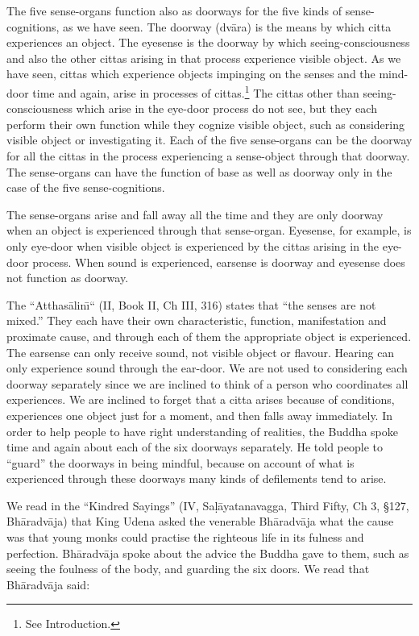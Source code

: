 \documentclass{book}
\begin{document}
The five sense-organs function also as doorways for the five kinds of
sense-cognitions, as we have seen. The doorway (dv{\=a}ra) is the
means by which citta experiences an object. The eyesense is the doorway
by which seeing-consciousness and also the other cittas arising in
that process experience visible object. As we have seen, cittas which
experience objects impinging on the senses and the mind-door time and
again, arise in processes of cittas.\footnote{See Introduction.} The cittas other than seeing-consciousness which
arise in the eye-door process do not see, but they each perform their
own function while they cognize visible object, such as considering
visible object or investigating it. Each of the five sense-organs can
be the doorway for all the cittas in the process experiencing a
sense-object through that doorway. The sense-organs can have the
function of base as well as doorway only in the case of the five
sense-cognitions. 

The sense-organs arise and fall away all the time and they are only
doorway when an object is experienced through that sense-organ.
Eyesense, for example, is only eye-door when visible object is
experienced by the cittas arising in the eye-door process. When sound
is experienced, earsense is doorway and eyesense does not function as
doorway.

The ``Atthas{\=a}lin\=\i`` (II, Book II, Ch III, 316) states that ``the
senses are not mixed.'' They each have their own characteristic,
function, manifestation and proximate cause, and through each of them
the appropriate object is experienced. The earsense can only receive
sound, not visible object or flavour. Hearing can only experience sound
through the ear-door. We are not used to considering each doorway
separately since we are inclined to think of a person who coordinates
all experiences. We are inclined to forget that a citta arises because
of conditions, experiences one object just for a moment, and then falls
away immediately. In order to help people to have right understanding
of realities, the Buddha spoke time and again about each of the six
doorways separately. He told people to ``guard'' the doorways in being
mindful, because on account of what is experienced through these
doorways many kinds of defilements tend to arise. 

We read in the ``Kindred Sayings'' (IV, Sa\d l{\=a}yatanavagga, Third
Fifty, Ch 3, {\S}127, Bh{\=a}radv{\=a}ja) that King Udena asked the
venerable Bh{\=a}radv{\=a}ja what the cause was that young monks could
practise the righteous life in its fulness and perfection.
Bh{\=a}radv{\=a}ja spoke about the advice the Buddha gave to them, such
as seeing the foulness of the body, and guarding the six doors. We read
that Bh{\=a}radv{\=a}ja said:
\end{document}
